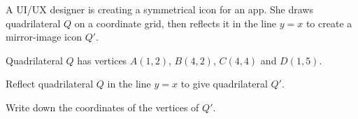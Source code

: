 \begin{question}
\noindent A UI/UX designer is creating a symmetrical icon for an app. She draws quadrilateral $Q$ on a coordinate grid, then reflects it in the line $y = x$ to create a mirror-image icon $Q'$.

\begin{center}
\end{center}

\noindent Quadrilateral $Q$ has vertices $A(1,2)$, $B(4,2)$, $C(4,4)$ and $D(1,5)$.

\noindent Reflect quadrilateral $Q$ in the line $y = x$ to give quadrilateral $Q'$.

\noindent Write down the coordinates of the vertices of $Q'$.

\vspace{4cm}

\begin{flushright}
\end{flushright}
\end{question}

